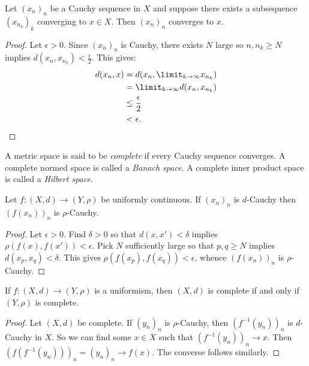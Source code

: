     \begin{proposition}
        Let $(x_n)_n$ be a Cauchy sequence in $X$ and suppose there exists a subsequence $(x_{n_k})_k$ converging to $x \in X$. Then $(x_n)_n$ converges to $x$.
    \end{proposition}
        \begin{proof}
            Let $\epsilon > 0$. Since $(x_n)_n$ is Cauchy, there exists $N$ large so $n,n_k \geq N$ implies $d(x_n,x_{n_k}) < \frac{\epsilon}{2}$. This gives:
                \begin{equation*}
                \begin{split}
                    d(x_n,x) 
                    & = d(x_n,\limit_{k \rightarrow \infty}x_{n_k}) \\
                    & = \limit_{k \rightarrow \infty} d(x_n,x_{n_k}) \\
                    & \leq \frac{\epsilon}{2} \\
                    & < \epsilon. \qedhere
                \end{split}
                \end{equation*}
        \end{proof}

    \begin{definition}
        A metric space is said to be \textit{complete} if every Cauchy sequence converges. A complete normed space is called a \textit{Banach space}. A complete inner product space is called a \textit{Hilbert space}.
    \end{definition}

    \begin{lemma}
        Let $f:(X,d) \rightarrow (Y,\rho)$ be uniformly continuous. If $(x_n)_n$ is $d$-Cauchy then $(f(x_n))_n$ is $\rho$-Cauchy.
    \end{lemma}
        \begin{proof}
            Let $\epsilon > 0$. Find $\delta > 0$ so that $d(x,x') < \delta$ implies $\rho(f(x),f(x')) < \epsilon$. Pick $N$ sufficiently large so that $p,q \geq N$ implies $d(x_p,x_q) < \delta$. This gives $\rho(f(x_p),f(x_q)) < \epsilon$, whence $(f(x_n))_n$ is $\rho$-Cauchy.
        \end{proof}

    \begin{corollary}
        If $f:(X,d) \rightarrow (Y,\rho)$ is a uniformism, then $(X,d)$ is complete if and only if $(Y,\rho)$ is complete.
    \end{corollary}
        \begin{proof}
            Let $(X,d)$ be complete. If $(y_n)_n$ is $\rho$-Cauchy, then $(f^{-1}(y_n))_n$ is $d$-Cauchy in $X$. So we can find some $x \in X$ such that $(f^{-1}(y_n))_n \rightarrow x$. Then $(f(f^{-1}(y_n)))_n = (y_n)_n \rightarrow f(x)$. The converse follows similarly.
        \end{proof}

